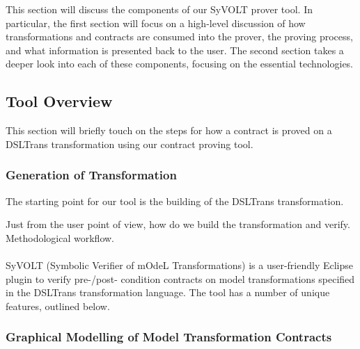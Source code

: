 This section will discuss the components of our SyVOLT prover tool. In particular, the first section will focus on a high-level discussion of how transformations and contracts are consumed into the prover, the proving process, and what information is presented back to the user. The second section takes a deeper look into each of these components, focusing on the essential technologies.

\subsection{Tool Overview}
This section will briefly touch on the steps for how a contract is proved on a DSLTrans transformation using our contract proving tool.


\subsubsection{Generation of Transformation}
The starting point for our tool is the building of the DSLTrans transformation.



Just from the user point of view, how do we build the transformation and
verify. Methodological workflow.\\\\

SyVOLT (Symbolic Verifier of mOdeL Transformations) is a user-friendly Eclipse plugin to verify pre-/post- condition contracts
on model transformations specified in the DSLTrans transformation language. The
tool has a number of unique features, outlined below.

\subsubsection{Graphical Modelling of Model Transformation Contracts}

